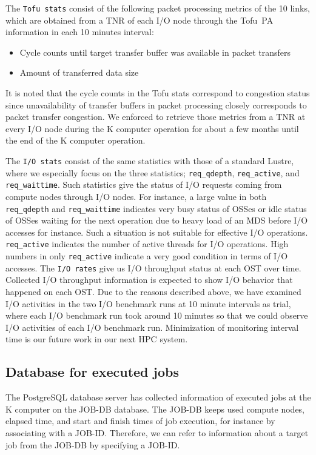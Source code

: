 \documentclass{jhps}
\begin{document}
The {\tt Tofu stats} consist of the following packet processing metrics of the 10 links,
which are obtained from a TNR of each I/O node through the Tofu~PA information
in each 10 minutes interval:
%
\begin{itemize}
\item Cycle counts until target transfer buffer was available in packet transfers
\item Amount of transferred data size
\end{itemize}
%
It is noted that the cycle counts in the Tofu stats correspond to congestion status
since unavailability of transfer buffers in packet processing closely corresponds to
packet transfer congestion.
We enforced to retrieve those metrics from a TNR at every I/O node
during the K computer operation for about a few months
until the end of the K computer operation.

The {\tt I/O stats} consist of the same statistics with those of a standard Lustre,
where we especially focus on the three statistics; {\tt req\_qdepth}, {\tt req\_active},
and {\tt req\_waittime}.
Such statistics give the status of I/O requests coming from compute nodes through I/O nodes.
For instance, a large value in both {\tt req\_qdepth} and {\tt req\_waittime} indicates
very busy status of OSSes or idle status of OSSes waiting for the next operation
due to heavy load of an MDS before I/O accesses for instance.
Such a situation is not suitable for effective I/O operations.
{\tt req\_active} indicates the number of active threads for I/O operations.
High numbers in only {\tt req\_active} indicate a very good condition in terms of I/O accesses.
The {\tt I/O rates} give us I/O throughput status at each OST over time.
Collected I/O throughput information is expected to show I/O behavior that happened
on each OST.
Due to the reasons described above, we have examined I/O activities
in the two I/O benchmark runs at 10 minute intervals as trial,
where each I/O benchmark run took around 10 minutes so that we could observe
I/O activities of each I/O benchmark run.
Minimization of monitoring interval time is our future work in our next HPC system.

\subsection{Database for executed jobs}

The PostgreSQL database server has collected information of executed jobs at the K computer
on the JOB-DB database.
The JOB-DB keeps used compute nodes, elapsed time, and start and finish times of job execution,
for instance by associating with a JOB-ID.
Therefore, we can refer to information about a target job from the JOB-DB by specifying a JOB-ID.
\end{document}
